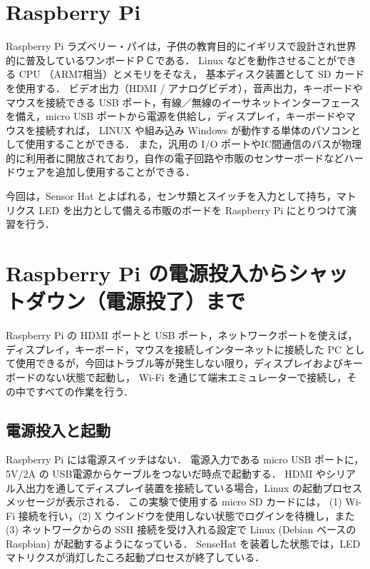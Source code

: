 \documentclass[11pt,a4,epsf]{report}
\begin{document}

\section{Raspberry Pi}

Raspberry Pi ラズベリー・パイ\cite{raspberry-pi-org}は，子供の教育目的にイギリスで設計され世界的に普及しているワンボードＰＣである．
Linux などを動作させることができる CPU （ARM7相当）とメモリをそなえ， 基本ディスク装置として SD カードを使用する．
ビデオ出力（HDMI / アナログビデオ），音声出力，キーボードやマウスを接続できる USB ポート，有線／無線のイーサネットインターフェースを備え，micro USB ポートから電源を供給し，ディスプレイ，キーボードやマウスを接続すれば，
LINUX や組み込み Windows が動作する単体のパソコンとして使用することができる．
また，汎用の I/O ポートやIC間通信のバスが物理的に利用者に開放されており，自作の電子回路や市販のセンサーボードなどハードウェアを追加し使用することができる．

今回は，Sensor Hat  とよばれる，センサ類とスイッチを入力として持ち，マトリクス LED を出力として備える市販のボードを Raspberry Pi にとりつけて演習を行う．


\section{Raspberry Pi の電源投入からシャットダウン（電源投了）まで}

Raspberry Pi の HDMI ポートと USB ポート，ネットワークポートを使えば，ディスプレイ，キーボード，マウスを接続しインターネットに接続した PC として使用できるが，今回はトラブル等が発生しない限り，ディスプレイおよびキーボードのない状態で起動し，
Wi-Fi を通じて端末エミュレーターで接続し，その中ですべての作業を行う．

\subsection{電源投入と起動}

Raspberry Pi には電源スイッチはない．
電源入力である micro USB ポートに，5V/2A の USB電源からケーブルをつないだ時点で起動する．
HDMI やシリアル入出力を通してディスプレイ装置を接続している場合，Linux の起動プロセスメッセージが表示される．
この実験で使用する micro SD カードには， (1)  Wi-Fi 接続を行い，(2) X ウインドウを使用しない状態でログインを待機し，また (3) ネットワークからの SSH 接続を受け入れる設定で Linux (Debian ベースの Raspbian) が起動するようになっている．
SenseHat を装着した状態では，LED マトリクスが消灯したころ起動プロセスが終了している．
\end{document}
